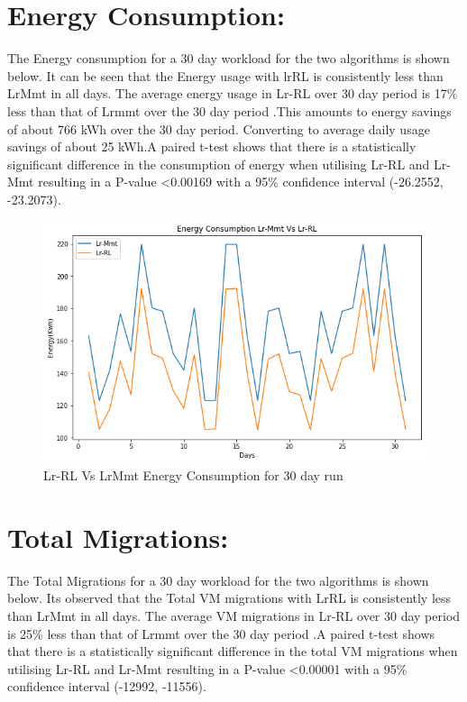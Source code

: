 \documentclass[a4paper,12pt]{Classes/RoboticsLaTeX}
\begin{document}
        \section{Energy Consumption:}
        The Energy consumption for  a 30 day workload for the two algorithms is shown below. It can be seen that the Energy usage with lrRL is consistently less than LrMmt  in all days. The average energy usage in Lr-RL over 30 day period  is 17\% less than that of Lrmmt over the 30 day period .This amounts to energy savings of about 766 kWh over the 30 day period. Converting to average  daily usage savings of about 25 kWh.A paired t-test shows that there is a statistically significant difference in the consumption of energy when utilising Lr-RL and Lr-Mmt resulting in a P-value <0.00169 with a 95\% confidence interval (-26.2552, -23.2073).

        \begin{figure}[H]
            \centering
            \includegraphics[width=0.75\linewidth]{Figures/Energy_Consumption_30day.png}
            \caption{Lr-RL Vs LrMmt Energy Consumption for 30 day run}
            \label{fig:enter-label}
        \end{figure}
        
        \section{Total Migrations:}
        
        The Total Migrations for  a 30 day workload for the two algorithms is shown below. Its observed that the Total VM migrations  with LrRL is consistently less than LrMmt  in all days. The average VM migrations in Lr-RL over 30 day period  is 25\% less than that of Lrmmt over the 30 day period .A paired t-test shows that there is a statistically significant difference in the total VM migrations  when utilising Lr-RL and Lr-Mmt resulting in a P-value <0.00001 with a 95\% confidence interval (-12992, -11556).
\end{document}
